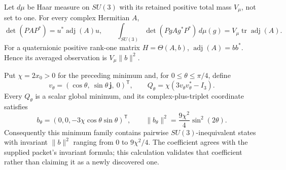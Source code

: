 \begin{proposition}
\label{q444:vacuum-average}
Let $d\mu$ be Haar measure on $SU(3)$ with its retained positive total
mass $V_\mu$, not set to one. For every complex Hermitian $A$,
\[
 \det(PAP^*)=u^*\operatorname{adj}(A)u,\qquad
 \int_{SU(3)}\det(PgAg^*P^*)\,d\mu(g)
                    =V_\mu\operatorname{tr}\operatorname{adj}(A).
\]
For a quaternionic positive rank-one matrix $H=\Theta(A,b)$,
$\operatorname{adj}(A)=bb^*$. Hence its averaged observation is
$V_\mu\|b\|^2$.

Put $\chi=2x_0>0$ for the preceding minimum and, for
$0\le\theta\le\pi/4$, define
\[
 v_\theta=(\cos\theta,\ \sin\theta\,\mathbf j,\ 0)^{\mathsf T},
 \qquad Q_\theta=\chi(3v_\theta v_\theta^*-I_3).
\]
Every $Q_\theta$ is a scalar global minimum, and its complex-plus-triplet
coordinate satisfies
\[
 b_\theta=(0,0,-3\chi\cos\theta\sin\theta)^{\mathsf T},\qquad
 \|b_\theta\|^2=\frac{9\chi^2}{4}\sin^2(2\theta).
\]
Consequently this minimum family contains pairwise $SU(3)$-inequivalent
states with invariant $\|b\|^2$ ranging from $0$ to $9\chi^2/4$.
The coefficient agrees with the supplied packet's invariant formula;
this calculation validates that coefficient rather than claiming it
as a newly discovered one.
\end{proposition}
